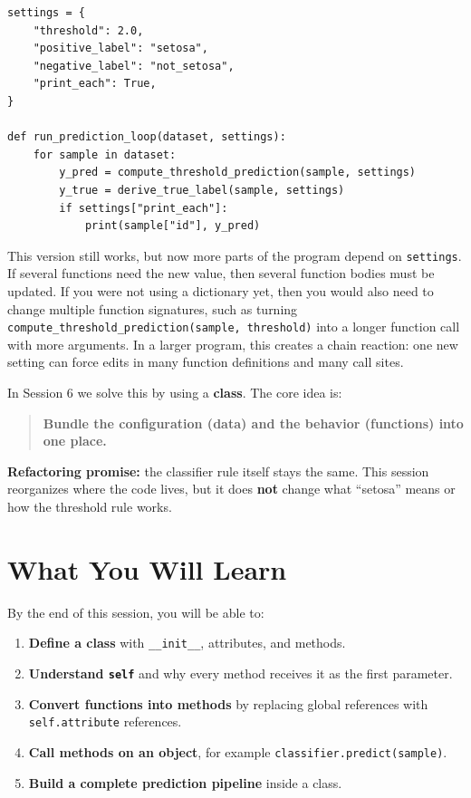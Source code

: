 \begin{verbatim}
settings = {
    "threshold": 2.0,
    "positive_label": "setosa",
    "negative_label": "not_setosa",
    "print_each": True,
}

def run_prediction_loop(dataset, settings):
    for sample in dataset:
        y_pred = compute_threshold_prediction(sample, settings)
        y_true = derive_true_label(sample, settings)
        if settings["print_each"]:
            print(sample["id"], y_pred)
\end{verbatim}

\noindent
This version still works, but now more parts of the program depend on \texttt{settings}.
If several functions need the new value, then several function bodies must be updated.
If you were not using a dictionary yet, then you would also need to change multiple function signatures, such as turning \texttt{compute\_threshold\_prediction(sample, threshold)} into a longer function call with more arguments.
In a larger program, this creates a chain reaction:
one new setting can force edits in many function definitions and many call sites.

\noindent
In Session 6 we solve this by using a \textbf{class}.
The core idea is:
\begin{quote}
\textbf{Bundle the configuration (data) and the behavior (functions) into one place.}
\end{quote}

\noindent
\textbf{Refactoring promise:} the classifier rule itself stays the same.
This session reorganizes where the code lives, but it does \textbf{not} change what ``setosa'' means or how the threshold rule works.

\section{What You Will Learn}
By the end of this session, you will be able to:
\begin{enumerate}
    \item \textbf{Define a class} with \texttt{\_\_init\_\_}, attributes, and methods.
    \item \textbf{Understand \texttt{self}} and why every method receives it as the first parameter.
    \item \textbf{Convert functions into methods} by replacing global references with \texttt{self.attribute} references.
    \item \textbf{Call methods on an object}, for example \texttt{classifier.predict(sample)}.
    \item \textbf{Build a complete prediction pipeline} inside a class.
\end{enumerate}

